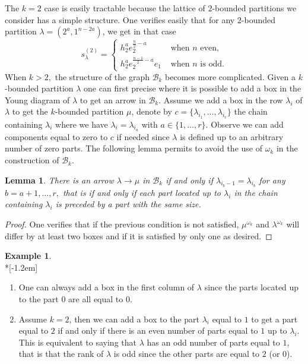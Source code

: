 \documentclass[10pt,a4paper]{amsart}
\newtheorem{lemma}[theorem]{Lemma}
\theoremstyle{definition}
\newtheorem{exam}[theorem]{Example}
\begin{document}
The $k=2$ case is easily tractable because the lattice of $2$-bounded
partitions we consider has a simple structure. One verifies easily that for
any $2$-bounded partition $\lambda=(2^{a},1^{n-2a})$, we get in that case
\[
s_{\lambda}^{(2)}=
\begin{cases}
h_{2}^{a}e_{2}^{\frac{n}{2}-a}&\text{ when }n\text{ even,}\\[4pt]
h_{2}^{a}e_{2}^{\frac{n-1}{2}-a}e_{1}&\text{ when }n\text{ is odd.}%
\end{cases}
\]
When $k>2,$ the structure of the graph $\mathcal{B}_{k}$ becomes more
complicated. Given a $k$-bounded partition $\lambda$ one can first precise
where it is possible to add a box in the Young diagram of $\lambda$ to get an
arrow in $\mathcal{B}_{k}$. Assume we add a box in the row $\lambda_{i}$ of
$\lambda$ to get the $k$-bounded partition $\mu$, denote by $c=\{\lambda
_{i_{1}},\ldots,\lambda_{i_{r}}\}$ the chain containing $\lambda_{i}$ where we
have $\lambda_{i}=\lambda_{i_{a}}$ with $a\in\{1,\ldots,r\}$. Observe we can
add components equal to zero to $c$ if needed since $\lambda$ is defined up to
an arbitrary number of zero parts. The following lemma permits to avoid the
use of $\omega_{k}$ in the construction of $\mathcal{B}_{k}$.

\begin{lemma}
\label{conditionArrow} There is an arrow $\lambda\rightarrow\mu$ in
$\mathcal{B}_{k}$ if and only if $\lambda_{i_{b}-1}=\lambda_{i_{b}}$ for any
$b=a+1,\ldots,r,$ that is if and only if each part located up to $\lambda_{i}$
in the chain containing $\lambda_{i}$ is preceded by a part with the same size.
\end{lemma}

\begin{proof}
One verifies that if the previous condition is not satisfied, $\mu^{\omega
_{k}}$ and $\lambda^{\omega_{k}}$ will differ by at least two boxes and if it
is satisfied by only one as desired.
\end{proof}


\begin{exam}\ \\*[-1.2em]

\begin{enumerate}
\item One can always add a box in the first column of $\lambda$ since the
parts located up to the part $0$ are all equal to $0$.

\item Assume $k=2$, then we can add a box to the part $\lambda_{i}$ equal to
$1$ to get a part equal to $2$ if and only if there is an even number of parts
equal to $1$ up to $\lambda_{i}$. This is equivalent to saying that $\lambda$
has an odd number of parts equal to $1$, that is that the rank of $\lambda$ is
odd since the other parts are equal to $2$ (or $0$).
\end{enumerate}
\end{exam}
\end{document}
